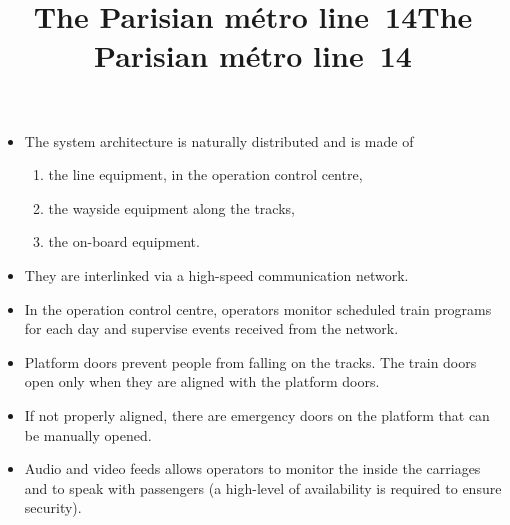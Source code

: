 \documentclass[wide]{slides}
\begin{document}
\begin{slide}
  \title{The Parisian m\'etro line~14}

  \begin{itemize}

    \item The system architecture is naturally distributed and
      is made of
      \begin{enumerate}

        \item the line equipment, in the operation control centre,

        \item the wayside equipment along the tracks,

        \item the on\hyp{}board equipment.

      \end{enumerate}

    \item They are interlinked via a high\hyp{}speed communication
      network.

  \end{itemize}

\end{slide}

\begin{slide}
  \title{The Parisian m\'etro line~14}

  \begin{itemize}

    \item In the operation control centre, operators monitor scheduled
      train programs for each day and supervise events received from
      the network.

      \item Platform doors prevent people from falling on the
        tracks. The train doors open only when they are aligned with
        the platform doors.

      \item If not properly aligned, there are emergency doors on the
        platform that can be manually opened.

      \item Audio and video feeds allows operators to monitor the
        inside the carriages and to speak with passengers (a
        high\hyp{}level of availability is required to ensure
        security).
  \end{itemize}

\end{slide}
\end{document}
